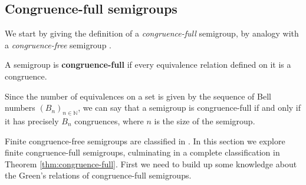 \subsection{Congruence-full semigroups}

We start by giving the definition of a \textit{congruence-full} semigroup, by
analogy with a \textit{congruence-free} semigroup \cite[3.7]{howie}.

\begin{definition}
  A semigroup is \textbf{congruence-full} if every equivalence relation defined
  on it is a congruence.
\end{definition}

Since the number of equivalences on a set is given by the sequence of Bell
numbers $(B_n)_{n \in \mathbb{N}}$, we can say that a semigroup is
congruence-full if and only if it has precisely $B_n$ congruences, where $n$ is
the size of the semigroup.

Finite congruence-free semigroups are classified in \cite[3.7]{howie}.
In this section we explore finite congruence-full semigroups, culminating in a
complete classification in Theorem \ref{thm:congruence-full}.  First we need to
build up some knowledge about the Green's relations of congruence-full
semigroups.

